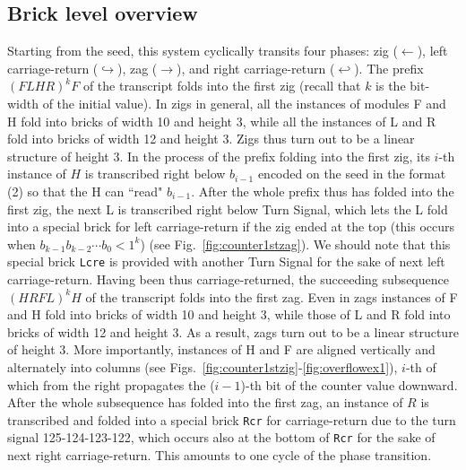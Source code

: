 \documentclass[runningheads]{llncs}
\begin{document}
\subsection{Brick level overview}
Starting from the seed, this system cyclically transits four phases: zig ($\leftarrow$), left carriage-return ($\hookrightarrow$), zag ($\rightarrow$), and right carriage-return ($\hookleftarrow$). 
The prefix $(FLHR)^k F$ of the transcript folds into the first zig (recall that $k$ is the bit-width of the initial value). 
In zigs in general, all the instances of modules F and H fold into bricks of width 10 and height 3, while all the instances of  L and R fold into bricks of width 12 and height 3. 
Zigs thus turn out to be a linear structure of height 3. 
In the process of the prefix folding into the first zig, its $i$-th instance of $H$ is transcribed right below $b_{i-1}$ encoded on the seed in the format (2) so that the H can ``read" $b_{i-1}$. 
After the whole prefix thus has folded into the first zig, the next L is transcribed right below Turn Signal, which lets the L fold into a special brick for left carriage-return if the zig ended at the top (this occurs when $b_{k-1} b_{k-2} \cdots b_0 < 1^k$) (see Fig.~\ref{fig:counter1stzag}). 
We should note that this special brick \texttt{Lcre} is provided with another Turn Signal for the sake of next left carriage-return.
Having been thus carriage-returned, the succeeding subsequence $(HRFL)^k H$ of the transcript folds into the first zag. 
Even in zags instances of F and H fold into bricks of width 10 and height 3, while those of L and R fold into bricks of width 12 and height 3. 
As a result, zags turn out to be a linear structure of height 3. 
More importantly, instances of H and F are aligned vertically and alternately into columns (see Figs.~\ref{fig:counter1stzig}-\ref{fig:overflowex1}), $i$-th of which from the right propagates the ($i{-}1$)-th bit of the counter value downward. 
After the whole subsequence has folded into the first zag, an instance of $R$ is transcribed and folded into a special brick \texttt{Rcr} for carriage-return due to the turn signal 125-124-123-122, which occurs also at the bottom of \texttt{Rcr} for the sake of next right carriage-return. 
This amounts to one cycle of the phase transition.
\end{document}

